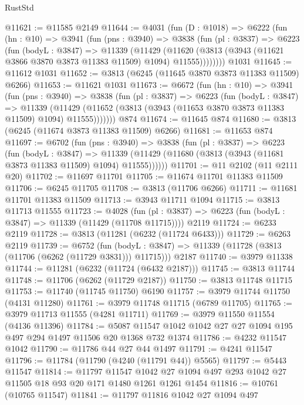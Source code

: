 \begin{lexlean}{RustStd}
\begin{coremodule}
@11621 := @11585 @2149
@11644 := @4031
    (fun (D : @1018) =>
    @6222
      (fun (hn : @10) =>
      @3941
        (fun (pns : @3940) =>
        @3838
          (fun (pl : @3837) =>
          @6223
            (fun (bodyL : @3847) =>
            @11339
              (@11429
                (@11620 (@3813 (@3943 (@11621 @3866 @3870 @3873 @11383 @11509) @1094) @11555))))))))
    @1031
@11645 := @11612 @1031
@11652 := @3813 (@6245 (@11645 @3870 @3873 @11383 @11509) @6266)
@11653 := @11621 @1031
@11673 := @6672
    (fun (hn : @10) =>
    @3941
      (fun (pns : @3940) =>
      @3838
        (fun (pl : @3837) =>
        @6223
          (fun (bodyL : @3847) =>
          @11339
            (@11429 (@11652 (@3813 (@3943 (@11653 @3870 @3873 @11383 @11509) @1094) @11555)))))))
    @874
@11674 := @11645 @874
@11680 := @3813 (@6245 (@11674 @3873 @11383 @11509) @6266)
@11681 := @11653 @874
@11697 := @6702
    (fun (pns : @3940) =>
    @3838
      (fun (pl : @3837) =>
      @6223
        (fun (bodyL : @3847) =>
        @11339 (@11429 (@11680 (@3813 (@3943 (@11681 @3873 @11383 @11509) @1094) @11555))))))
@11701 := @11 @2102 (@11 @2111 @20)
@11702 := @11697 @11701
@11705 := @11674 @11701 @11383 @11509
@11706 := @6245 @11705
@11708 := @3813 (@11706 @6266)
@11711 := @11681 @11701 @11383 @11509
@11713 := @3943 @11711 @1094
@11715 := @3813 @11713 @11555
@11723 := @4028
    (fun (pl : @3837) => @6223 (fun (bodyL : @3847) => @11339 (@11429 (@11708 @11715))))
    @2119
@11724 := @6233 @2119
@11728 := @3813 (@11281 (@6232 (@11724 @6433)))
@11729 := @6263 @2119
@11739 := @6752
    (fun (bodyL : @3847) => @11339 (@11728 (@3813 (@11706 (@6262 (@11729 @3831))) @11715)))
    @2187
@11740 := @3979 @11338
@11744 := @11281 (@6232 (@11724 (@6432 @2187)))
@11745 := @3813 @11744
@11748 := @11706 (@6262 (@11729 @2187))
@11750 := @3813 @11748 @11715
@11753 := @11740 (@11745 @11750) @6190
@11757 := @3979 @11744 @11750 (@4131 @11280)
@11761 := @3979 @11748 @11715 (@6789 @11705)
@11765 := @3979 @11713 @11555 (@4281 @11711)
@11769 := @3979 @11550 @11554 (@4136 @11396)
@11784 := @5087 @11547 @1042 @1042 @27 @27 @1094 @195 @497 @294 @1497 @11506 @20 @1368 @732 @1374
@11786 := @4232 @11547 @1042
@11790 := @11786 @44 @27 @44 @1497
@11791 := @4241 @11547
@11796 := @11784 (@11790 (@4240 (@11791 @44)) @5565)
@11797 := @5443 @11547
@11814 := @11797
    @11547
    @1042
    @27
    @1094
    @497
    @293
    @1042
    @27
    @11505
    @18
    @93
    @20
    @171
    @1480
    @1261
    @1261
    @1454
@11816 := @10761 (@10765 @11547)
@11841 := @11797
    @11816
    @1042
    @27
    @1094
    @497

\end{coremodule}
\end{lexlean}
